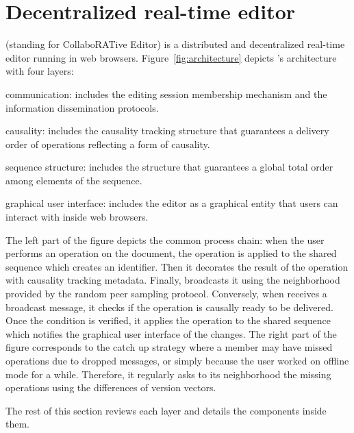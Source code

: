 
\section{Decentralized real-time editor}
\label{sec:editor}

\CRATE (standing for CollaboRATive Editor) is a distributed and decentralized
real-time editor running in web browsers.  Figure~\ref{fig:architecture} depicts
\CRATE's architecture with four layers:
\begin{inparaenum}[(i)]
\item communication: includes the editing session membership mechanism and the
  information dissemination protocols.
\item causality: includes the causality tracking structure that guarantees a
  delivery order of operations reflecting a form of causality.
\item sequence structure: includes the structure that guarantees a global
  total order among elements of the sequence.
\item graphical user interface: includes the editor as a graphical entity that
  users can interact with inside web browsers.
\end{inparaenum}
The left part of the figure depicts the common process chain: when the user
performs an operation on the document, the operation is applied to the shared
sequence which creates an \LSEQ identifier. Then it decorates the result of the
operation with causality tracking metadata. Finally, \CRATE broadcasts it using
the neighborhood provided by the \SPRAY random peer sampling protocol.
Conversely, when \CRATE receives a broadcast message, it checks if the operation
is causally ready to be delivered. Once the condition is verified, it applies
the operation to the shared sequence which notifies the graphical user interface
of the changes.  The right part of the figure corresponds to the catch up
strategy where a member may have missed operations due to dropped messages, or
simply because the user worked on offline mode for a while. Therefore, it
regularly asks to its neighborhood the missing operations using the differences
of version vectors.


The rest of this section reviews each layer and details the components inside
them.

